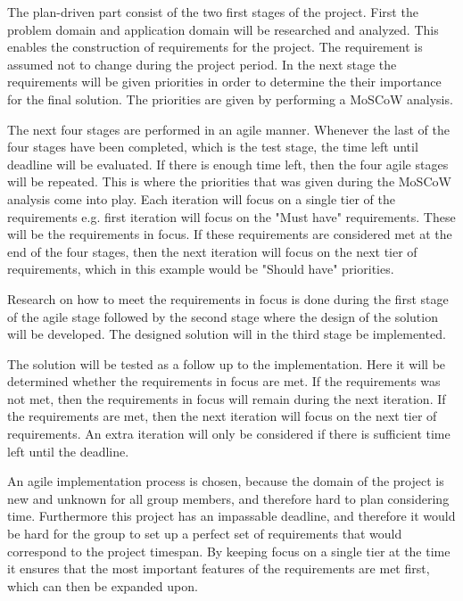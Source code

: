 The plan-driven part consist of the two first stages of the project. First the problem domain and application domain will be researched and analyzed. This enables the construction of requirements for the project. The requirement is assumed not to change during the project period. In the next stage the requirements will be given priorities in order to determine the their importance for the final solution. The priorities are given by performing a MoSCoW analysis.

The next four stages are performed in an agile manner. Whenever the last of the four stages have been completed, which is the test stage, the time left until deadline will be evaluated. If there is enough time left, then the four agile stages will be repeated. This is where the priorities that was given during the MoSCoW analysis come into play. Each iteration will focus on a single tier of the requirements e.g. first iteration will focus on the "Must have" requirements. These will be the requirements in focus. If these requirements are considered met at the end of the four stages, then the next iteration will focus on the next tier of requirements, which in this example would be "Should have" priorities.

Research on how to meet the requirements in focus is done during the first stage of the agile stage followed by the second stage where the design of the solution will be developed. The designed solution will in the third stage be implemented.

The solution will be tested as a follow up to the implementation. Here it will be determined whether the requirements in focus are met. If the requirements was not met, then the requirements in focus will remain during the next iteration. If the requirements are met, then the next iteration will focus on the next tier of requirements. An extra iteration will only be considered if there is sufficient time left until the deadline.

An agile implementation process is chosen, because the domain of the project is new and unknown for all group members, and therefore hard to plan considering time. Furthermore this project has an impassable deadline, and therefore it would be hard for the group to set up a perfect set of requirements that would correspond to the project timespan. By keeping focus on a single tier at the time it ensures that the most important features of the requirements are met first, which can then be expanded upon.
































